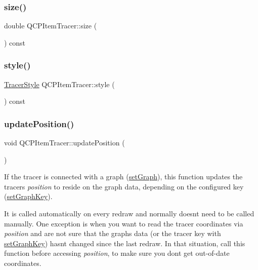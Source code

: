 \subsubsection{\texorpdfstring{size()}{size()}}
{\footnotesize\ttfamily double Q\+C\+P\+Item\+Tracer\+::size (\begin{DoxyParamCaption}{ }\end{DoxyParamCaption}) const\hspace{0.3cm}{\ttfamily [inline]}}

\mbox{\label{class_q_c_p_item_tracer_afdaee32c9ccc9c14502b28d3d86bf5ed}} 
\subsubsection{\texorpdfstring{style()}{style()}}
{\footnotesize\ttfamily \mbox{\hyperlink{class_q_c_p_item_tracer_a2f05ddb13978036f902ca3ab47076500}{Tracer\+Style}} Q\+C\+P\+Item\+Tracer\+::style (\begin{DoxyParamCaption}{ }\end{DoxyParamCaption}) const\hspace{0.3cm}{\ttfamily [inline]}}

\mbox{\label{class_q_c_p_item_tracer_a5b90296109e36384aedbc8908a670413}} 
\subsubsection{\texorpdfstring{updatePosition()}{updatePosition()}}
{\footnotesize\ttfamily void Q\+C\+P\+Item\+Tracer\+::update\+Position (\begin{DoxyParamCaption}{ }\end{DoxyParamCaption})}

If the tracer is connected with a graph (\mbox{\hyperlink{class_q_c_p_item_tracer_af5886f4ded8dd68cb4f3388f390790c0}{set\+Graph}}), this function updates the tracer\textquotesingle{}s {\itshape position} to reside on the graph data, depending on the configured key (\mbox{\hyperlink{class_q_c_p_item_tracer_a6840143b42f3b685cedf7c6d83a704c8}{set\+Graph\+Key}}).

It is called automatically on every redraw and normally doesn\textquotesingle{}t need to be called manually. One exception is when you want to read the tracer coordinates via {\itshape position} and are not sure that the graph\textquotesingle{}s data (or the tracer key with \mbox{\hyperlink{class_q_c_p_item_tracer_a6840143b42f3b685cedf7c6d83a704c8}{set\+Graph\+Key}}) hasn\textquotesingle{}t changed since the last redraw. In that situation, call this function before accessing {\itshape position}, to make sure you don\textquotesingle{}t get out-\/of-\/date coordinates.

